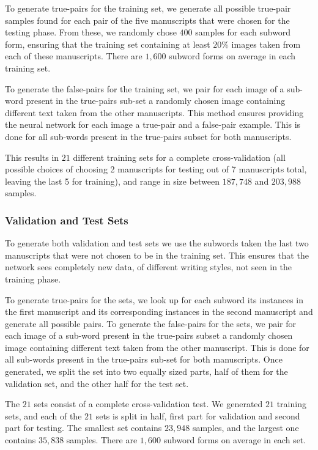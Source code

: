 \documentclass[10pt, a4paper, conference, compsocconf]{IEEEtran}
\begin{document}
To generate true-pairs for the training set, we generate all possible true-pair samples found for each pair of the five manuscripts that were chosen for the testing phase. From these, we randomly chose $400$ samples for each subword form, ensuring that the training set containing at least $20\%$ images taken from each of these manuscripts. There are $1,600$ subword forms on average in each training set.

To generate the false-pairs for the training set, we pair for each image of a sub-word present in the true-pairs sub-set a randomly chosen image containing different text taken from the other manuscripts. This method ensures providing the neural network for each image a true-pair and a false-pair example. This is done for all sub-words present in the true-pairs subset for both manuscripts.

This results in $21$ different training sets for a complete cross-validation (all possible choices of choosing 2 manuscripts for testing out of 7 manuscripts total, leaving the last 5 for training), and range in size between $187,748$ and $203,988$ samples.

\subsubsection{Validation and Test Sets}
To generate both validation and test sets we use the subwords taken the last two manuscripts that were not chosen to be in the training set. This ensures that the network sees completely new data, of different writing styles, not seen in the training phase.

To generate true-pairs for the sets, we look up for each subword its instances in the first manuscript and its corresponding instances in the second manuscript and generate all possible pairs. To generate the false-pairs for the sets, we pair for each image of a sub-word present in the true-pairs subset a randomly chosen image containing different text taken from the other manuscript. This is done for all sub-words present in the true-pairs sub-set for both manuscripts. Once generated, we split the set into two equally sized parts, half of them for the validation set, and the other half for the test set.

The $21$ sets consist of a complete cross-validation test. We generated $21$ training sets, and each of the $21$ sets is split in half, first part  for validation and second part for testing. The smallest set contains $23,948$ samples, and the largest one contains $35,838$ samples. There are $1,600$ subword forms on average in each set.
\end{document}
